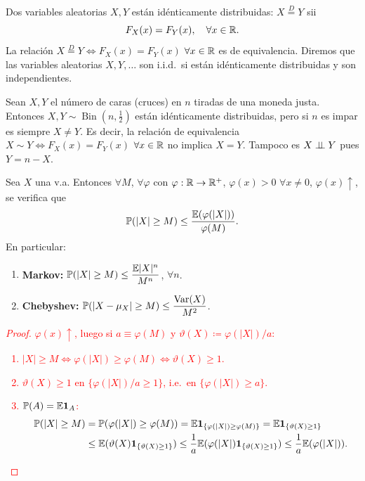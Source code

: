 \begin{definicion}[19]
Dos variables aleatorias $X, Y$ están idénticamente distribuidas: $X \stackrel{D}{=} Y$ sii
\[
  F_X(x) = F_Y(x), \quad \forall x \in \mathbb{R}.
\]
La relación $X \stackrel{D}{=} Y \iff F_X(x) = F_Y(x)$ $\forall x \in \mathbb{R}$ es de equivalencia. Diremos que las variables aleatorias $X, Y, \dots$ son i.i.d.\ si están idénticamente distribuidas y son independientes.
\end{definicion}

\begin{ejemplo}
Sean $X, Y$ el número de caras (cruces) en $n$ tiradas de una moneda justa. Entonces $X, Y \sim \operatorname{Bin}(n, \frac{1}{2})$ están idénticamente distribuidas, pero si $n$ es impar es siempre $X \neq Y$. Es decir, la relación de equivalencia $X \sim Y \iff F_X(x) = F_Y(x)$ $\forall x \in \mathbb{R}$ no implica $X = Y$. Tampoco es $X \perp\!\!\!\perp Y$ pues $Y = n - X$.
\end{ejemplo}

\begin{teorema}
Sea $X$ una v.a. Entonces $\forall M$, $\forall \varphi$ con $\varphi : \mathbb{R} \to \mathbb{R}^+$, $\varphi(x) > 0$ $\forall x \neq 0$, $\varphi(x)\uparrow$, se verifica que
\[
  \mathbb{P}(|X| \ge M) \le \frac{\mathbb{E}(\varphi(|X|))}{\varphi(M)}.
\]
En particular:
\begin{enumerate}
  \item \textbf{Markov:} $\mathbb{P}(|X| \ge M) \le \dfrac{\mathbb{E}|X|^n}{M^n}$, $\forall n$.
  \item \textbf{Chebyshev:} $\mathbb{P}(|X - \mu_X| \ge M) \le \dfrac{\operatorname{Var}(X)}{M^2}$.
\end{enumerate}
\end{teorema}
\textcolor{red}{
\begin{proof}
$\varphi(x)\uparrow$, luego si $a \equiv \varphi(M)$ y $\vartheta(X) \coloneqq \varphi(|X|)/a$:
\begin{enumerate}
  \item $|X| \ge M \iff \varphi(|X|) \ge \varphi(M) \iff \vartheta(X) \ge 1$.
  \item $\vartheta(X) \ge 1$ en $\{\varphi(|X|)/a \ge 1\}$, i.e.\ en $\{\varphi(|X|) \ge a\}$.
  \item $\mathbb{P}(A) = \mathbb{E} \mathbf{1}_A$:
        \begin{align*}
          \mathbb{P}(|X| \ge M) &= \mathbb{P}(\varphi(|X|) \ge \varphi(M)) = \mathbb{E}\mathbf{1}_{\{\varphi(|X|) \ge \varphi(M)\}} = \mathbb{E}\mathbf{1}_{\{\vartheta(X) \ge 1\}} \\
                           &\le \mathbb{E}(\vartheta(X)\mathbf{1}_{\{\vartheta(X) \ge 1\}}) \le \frac{1}{a}\mathbb{E}(\varphi(|X|)\mathbf{1}_{\{\vartheta(X) \ge 1\}}) \le \frac{1}{a}\mathbb{E}(\varphi(|X|)).
        \end{align*}
\end{enumerate}
\end{proof}}

